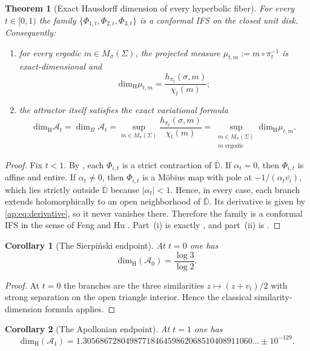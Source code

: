 \documentclass[11pt]{amsart}
\newtheorem{theorem}{Theorem}[section]
\newtheorem{corollary}[corollary]{Corollary}
\theoremstyle{definition}
\newcommand{\Disk}{\overline{\mathbb{D}}}
\newcommand{\dimH}{\operatorname{dim_{H}}}
\begin{document}
\begin{theorem}[Exact Hausdorff dimension of every hyperbolic fiber]\label{ap:thm:exact-dim}
For every $t\in[0,1)$ the family $\{\Phi_{1,t},\Phi_{2,t},\Phi_{3,t}\}$ is a conformal IFS on the closed unit disk. Consequently:
\begin{enumerate}[label=(\roman*)]
\item for every ergodic $m\in M_\sigma(\Sigma)$, the projected measure $\mu_{t,m}:=m\circ\pi_t^{-1}$ is exact-dimensional and
\[
  \dimH \mu_{t,m}=\frac{h_{\pi_t}(\sigma,m)}{\chi_t(m)};
\]
\item the attractor itself satisfies the exact variational formula
\[
  \dimH \mathcal A_t = \dim_B \mathcal A_t
  = \sup_{m\in M_\sigma(\Sigma)} \frac{h_{\pi_t}(\sigma,m)}{\chi_t(m)}
  = \sup_{\substack{m\in M_\sigma(\Sigma)\\ m\text{ ergodic}}} \dimH\mu_{t,m}.
\]
\end{enumerate}
\end{theorem}

\begin{proof}
Fix $t<1$. By , each $\Phi_{i,t}$ is a strict contraction of $\Disk$. If $\alpha_t=0$, then $\Phi_{i,t}$ is affine and entire. If $\alpha_t\ne0$, then $\Phi_{i,t}$ is a M\"obius map with pole at $-1/(\alpha_t\overline{v_i})$, which lies strictly outside $\Disk$ because $|\alpha_t|<1$. Hence, in every case, each branch extends holomorphically to an open neighborhood of $\Disk$. Its derivative is given by \eqref{ap:eq:derivative}, so it never vanishes there. Therefore the family is a conformal IFS in the sense of Feng and Hu \cite[Definition~2.9]{FengHu2009}. Part~(i) is exactly \cite[Theorem~2.8]{FengHu2009}, and part~(ii) is \cite[Theorem~2.13]{FengHu2009}.
\end{proof}

\begin{corollary}[The Sierpi\'nski endpoint]\label{ap:cor:sierp-dim}
At $t=0$ one has
\[
  \dimH(\mathcal A_0)=\frac{\log 3}{\log 2}.
\]
\end{corollary}

\begin{proof}
At $t=0$ the branches are the three similarities $z\mapsto(z+v_i)/2$ with strong separation on the open triangle interior. Hence the classical similarity-dimension formula applies.
\end{proof}

\begin{corollary}[The Apollonian endpoint]\label{ap:cor:apol-dim}
At $t=1$ one has
\[
  \dimH(\mathcal A_1)=1.3056867280498771846459862068510408911060\ldots \pm 10^{-129}.
\]
\end{corollary}
\end{document}
